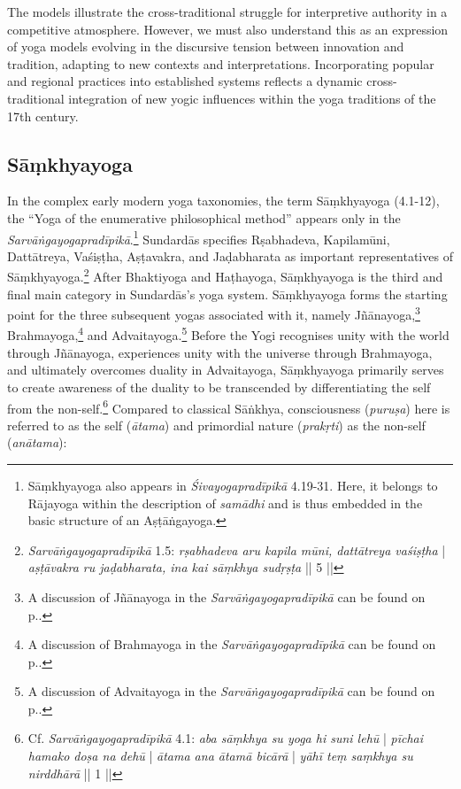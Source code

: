 The models illustrate the cross-traditional struggle for interpretive authority in a competitive atmosphere. However, we must also understand this as an expression of yoga models evolving in the discursive tension between innovation and tradition, adapting to new contexts and interpretations. Incorporating popular and regional practices into established systems reflects a dynamic cross-traditional integration of new yogic influences within the yoga traditions of the 17th century.

\subsection{Sāṃkhyayoga}
\label{samkhyayoga}

In the complex early modern yoga taxonomies, the term Sāṃkhyayoga (4.1-12), the ``Yoga of the enumerative philosophical method'' appears only in the \textit{Sarvāṅgayogapradīpikā}.\footnote{Sāṃkhyayoga also appears in \emph{Śivayogapradīpikā} 4.19-31. Here, it belongs to Rājayoga within the description of \textit{samādhi} and is thus embedded in the basic structure of an Aṣṭāṅgayoga.} Sundardās specifies Rṣabhadeva, Kapilamūni, Dattātreya, Vaśiṣṭha, Aṣṭavakra, and Jaḍabharata as important representatives of Sāṃkhyayoga.\footnote{\emph{Sarvāṅgayogapradīpikā} 1.5: \textit{rṣabhadeva aru kapila mūni, dattātreya vaśiṣṭha} | \textit{aṣṭāvakra ru jaḍabharata, ina kai sāṃkhya sudṛṣṭa} || 5 ||} After Bhaktiyoga and Haṭhayoga, Sāṃkhyayoga is the third and final main category in Sundardās's yoga system. Sāṃkhyayoga forms the starting point for the three subsequent yogas associated with it, namely Jñānayoga,\footnote{A discussion of Jñānayoga in the \emph{Sarvāṅgayogapradīpikā} can be found on p.\pageref{jnanayogaintrocandrika}.} Brahmayoga,\footnote{A discussion of Brahmayoga in the \emph{Sarvāṅgayogapradīpikā} can be found on p.\pageref{sundarbrahma}.} and Advaitayoga.\footnote{A discussion of Advaitayoga in the \emph{Sarvāṅgayogapradīpikā} can be found on p.\pageref{sundaradvaita}.} Before the Yogi recognises unity with the world through Jñānayoga, experiences unity with the universe through Brahmayoga, and ultimately overcomes duality in Advaitayoga, Sāṃkhyayoga primarily serves to create awareness of the duality to be transcended by differentiating the self from the non-self.\footnote{Cf. \emph{Sarvāṅgayogapradīpikā} 4.1: \textit{aba sāṃkhya su yoga hi suni lehū} | \textit{pīchai hamako doṣa na dehū} | \textit{ātama ana ātamā bicārā} | \textit{yāhī teṃ saṃkhya su nirddhārā} || 1 ||} Compared to classical Sāṅkhya, consciousness (\textit{puruṣa}) here is referred to as the self (\textit{ātama}) and primordial nature (\textit{prakṛti}) as the non-self (\textit{anātama}):

